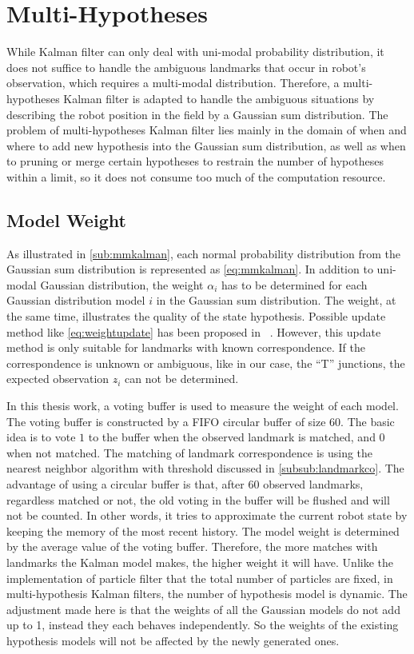 \chapter{Multi-Hypotheses\label{cha:chapter5}}
While Kalman filter can only deal with uni-modal probability distribution, it does not suffice to handle the ambiguous landmarks that occur in robot's observation, which requires a multi-modal distribution. Therefore, a multi-hypotheses Kalman filter is adapted to handle the ambiguous situations by describing the robot position in the field by a Gaussian sum distribution.
The problem of multi-hypotheses Kalman filter lies mainly in the domain of when and where to add new hypothesis into the Gaussian sum distribution, as well as when to pruning or merge certain hypotheses to restrain the number of hypotheses within a limit, so it does not consume too much of the computation resource.


\section{Model Weight}
As illustrated in \autoref{sub:mmkalman}, each normal probability distribution from the Gaussian sum distribution is represented as \autoref{eq:mmkalman}. In addition to uni-modal Gaussian distribution, the weight $\alpha_i$ has to be determined for each Gaussian distribution model $i$ in the Gaussian sum distribution. The weight, at the same time, illustrates the quality of the state hypothesis. Possible update method like \autoref{eq:weightupdate} has been proposed in ~\cite{alspach1972nonlinear}. However, this update method is only suitable for landmarks with known correspondence. If the correspondence is unknown or ambiguous, like in our case, the ``T'' junctions, the expected observation $z\widehat{}_i$ can not be determined. 

In this thesis work, a voting buffer is used to measure the weight of each model. The voting buffer is constructed by a \gls{FIFO} circular buffer of size $60$. The basic idea is to vote $1$ to the buffer when the observed landmark is matched, and $0$ when not matched. The matching of landmark correspondence is using the nearest neighbor algorithm with threshold discussed in \autoref{subsub:landmarkco}. 
The advantage of using a circular buffer is that, after $60$ observed landmarks, regardless matched or not, the old voting in the buffer will be flushed and will not be counted. In other words, it tries to approximate the current robot state by keeping the memory of the most recent history. The model weight is determined by the average value of the voting buffer. Therefore, the more matches with landmarks the Kalman model makes, the higher weight it will have. Unlike the implementation of particle filter that the total number of particles are fixed, in multi-hypothesis Kalman filters, the number of hypothesis model is dynamic. The adjustment made here is that the weights of all the Gaussian models do not add up to 1, instead they each behaves independently. So the weights of the existing hypothesis models will not be affected by the newly generated ones.

